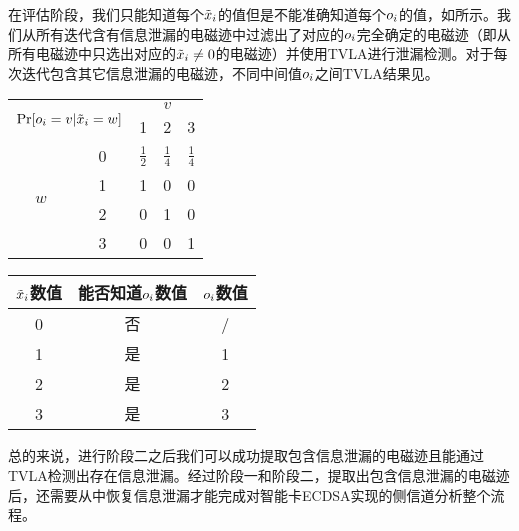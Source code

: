 {	在评估阶段，我们只能知道每个$\tilde {x}_i$的值但是不能准确知道每个$o_i$的值，如所示。我们从所有迭代含有信息泄漏的电磁迹中过滤出了对应的$o_i$完全确定的电磁迹（即从所有电磁迹中只选出对应的$\tilde {x}_i\neq0$的电磁迹）并使用TVLA进行泄漏检测。对于每次迭代包含其它信息泄漏的电磁迹，不同中间值$o_i$之间TVLA结果见。
	
	\begin{table}[!htb]
		\label{tab:partialknownti}
		\centering
		\begin{subtable}{\twof\textwidth}
			\centering
			\begin{tabular}{cc|ccc}
				\hline
				\multicolumn{2}{c|}{\multirow{2}{*}{$\Pr[o_i=v|\tilde {x}_i=w]$}} & \multicolumn{3}{c}{$v$} \\
				\multicolumn{2}{c|}{}& 1 & 2 & 3 \\
				\hline
				\multirow{4}{*}{$w$} & 0 & $\frac12$ & $\frac14$ & $\frac14$ \\
				& 1 & 1 & 0 & 0 \\
				& 2 & 0 & 1 & 0 \\
				& 3 & 0 & 0 & 1 \\
				\hline
			\end{tabular}
			\label{tab:partialknowntidetail}
		\end{subtable}\hfill
		\begin{subtable}{\twof\textwidth}
			\centering
			\begin{tabular}{c|cc}
				\hline
				$\tilde {x}_i$数值&能否知道$o_i$数值&$o_i$数值\\
				\hline
				0 & 否 & /\\
				1 & 是 & 1\\
				2 & 是 & 2\\
				3 & 是 & 3\\
				\hline
			\end{tabular}
			\label{tab:partialknownticonclusion}
		\end{subtable}
	\end{table}

	总的来说，进行阶段二之后我们可以成功提取包含信息泄漏的电磁迹且能通过TVLA检测出存在信息泄漏。经过阶段一和阶段二，提取出包含信息泄漏的电磁迹后，还需要从中恢复信息泄漏才能完成对智能卡ECDSA实现的侧信道分析整个流程。
}
